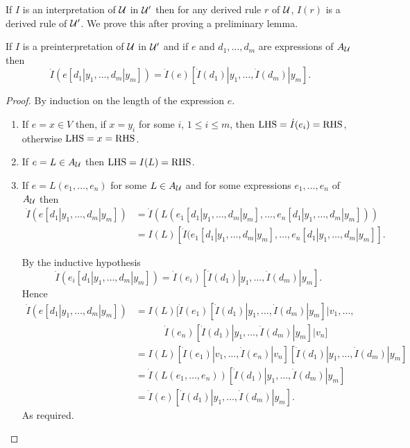 If $I$ is an interpretation of $\mathcal{U}$ in $\mathcal{U}'$ then for any derived rule $r$ of $\mathcal{U}$, $I(r)$  is a derived rule of $\mathcal{U}'$.
%
 We prove this after proving a preliminary lemma.

\begin{lemma}[1]
 If $I$ is a preinterpretation of $\mathcal{U}$ in $\mathcal{U}'$ and if $e$ and $d_1,\ldots,d_m$ are expressions of $A_{\mathcal{U}}$ then
\[
\dot I(e[d_1|y_1,\ldots,d_m|y_m]) = \dot I(e)[\dot I(d_1)|y_1,\ldots,\dot I(d_m)|y_m].
\]
\end{lemma}
\begin{proof} By induction on the length of the expression $e$.

  \begin{enumerate}
  \item If $e=x\in V$ then, if $x = y_i$ for some $i$, $1\leq i\leq m$, then $\text{LHS} = \dot I(e_i) = \text{RHS}$, otherwise $\text{LHS} = x = \text{RHS}$.

  \item If $e = L\in A_{\mathcal{U}}$ then $\text{LHS} = I(L) = \text{RHS}$.

  \item If $e = L(e_1,\ldots,e_n)$ for some $L\in A_{\mathcal{U}}$ and for some expressions $e_1,\ldots,e_n$ of $A_{\mathcal{U}}$ then
    \begin{align*}
      \dot I(e[d_1|y_1,\ldots,d_m|y_m])
      &= \dot I(L(e_1[d_1|y_1,\ldots,d_m|y_m],\ldots,e_n[d_1|y_1,\ldots,d_m|y_m])) \\
      &= I(L)[\dot I(e_1[d_1|y_1,\ldots,d_m|y_m],\ldots,e_n[d_1|y_1,\ldots,d_m|y_m]].
    \end{align*}

    By the inductive hypothesis 
\[\dot I(e_i[d_1|y_1,\ldots,d_m|y_m]) = \dot I(e_i)[\dot I(d_1)|y_1,\ldots,\dot I(d_m)|y_m].\]
 Hence
    \begin{align*}
      \dot I(e[d_1|y_1,\ldots,d_m|y_m])
      &= I(L)[\dot I(e_1)[\dot I(d_1)|y_1,\ldots,\dot I(d_m)|y_m]|v_1,\ldots,\\
      &\qquad\quad\dot I(e_n)[\dot I(d_1)|y_1,\ldots,\dot I(d_m)|y_m]|v_n]\\
      &= I(L)[\dot I(e_1)|v_1,\ldots,\dot I(e_n)|v_n][\dot I(d_1)|y_1,\ldots,\dot I(d_m)|y_m]\\
      &= \dot I(L(e_1,\ldots,e_n))[\dot I(d_1)|y_1,\ldots,\dot I(d_m)|y_m]\\
      &= \dot I(e)[\dot I(d_1)|y_1,\ldots,\dot I(d_m)|y_m].
    \end{align*}
    As required.
  \end{enumerate}
\end{proof}


